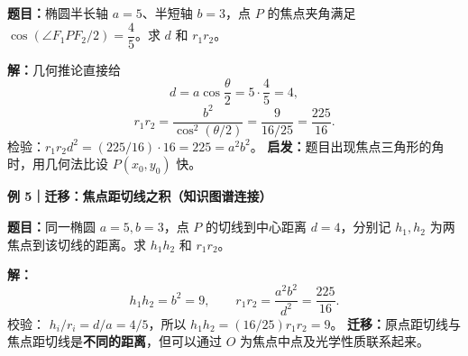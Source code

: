 \begin{examplebox}
\textbf{题目：}椭圆半长轴 $a=5$、半短轴 $b=3$，点 $P$ 的焦点夹角满足 $\cos(\angle F_1PF_2/2)=\dfrac45$。求 $d$ 和 $r_1r_2$。

\textbf{解：}几何推论直接给
\[
d=a\cos\frac\theta2=5\cdot\frac45=\boxed{4},
\]
\[
r_1r_2=\frac{b^2}{\cos^2(\theta/2)}
=\frac9{16/25}=\boxed{\frac{225}{16}}.
\]
检验：$r_1r_2d^2=(225/16)\cdot16=225=a^2b^2$。
\textbf{启发：}题目出现焦点三角形的角时，用几何法比设 $P(x_0,y_0)$ 快。

\medskip
\textbf{\textcolor{CExample}{例 5｜迁移：焦点距切线之积（知识图谱连接）}}

\textbf{题目：}同一椭圆 $a=5,b=3$，点 $P$ 的切线到中心距离 $d=4$，分别记 $h_1,h_2$ 为两焦点到该切线的距离。求 $h_1h_2$ 和 $r_1r_2$。

\textbf{解：}
\[
\boxed{h_1h_2=b^2=9},\qquad
\boxed{r_1r_2=\frac{a^2b^2}{d^2}
=\frac{225}{16}}.
\]
校验： $h_i/r_i=d/a=4/5$，所以 $h_1h_2=(16/25)r_1r_2=9$。
\textbf{迁移：}原点距切线与焦点距切线是\textbf{不同的距离}，但可以通过 $O$ 为焦点中点及光学性质联系起来。
\end{examplebox}
